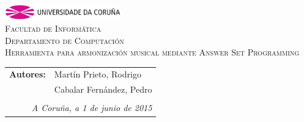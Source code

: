 \begin{titlepage}
\begin{center}
\includegraphics[width=5cm]{imagenes/anagramaUDC.png}\\[0.5cm]
{\textsc{Facultad de Informática}} \\
{\large \textsc{Departamento de Computación}} \\[1cm]
{\Large \textsc{Herramienta para armonización musical mediante Answer Set Programming}} \\[2cm]
\vfill
\begin{flushright}
\begin{tabular}{ll}
\textbf{Autores:}	 & Martín Prieto, Rodrigo \\
					 & Cabalar Fernández, Pedro \\
& \\
\multicolumn{2}{r}{\small \emph{A Coruña, a 1 de junio de 2015}} \\
\end{tabular}
\end{flushright}
\end{center}
\end{titlepage}
